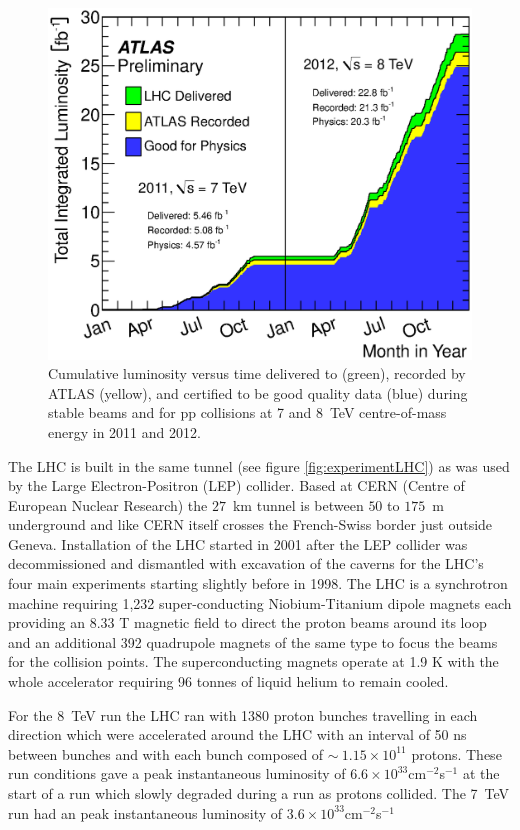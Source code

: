 	\begin{figure}[h!]
        \begin{center}
			\includegraphics[width=0.9\linewidth]{images/intlumivstime2011-2012DQ.eps}
        \end{center}
        \caption{Cumulative luminosity versus time delivered to (green), recorded by ATLAS (yellow), and certified to be good quality data (blue) during stable beams and for pp collisions at 7 and 8~TeV centre-of-mass energy in 2011 and 2012. \cite{LuPublicResults}}
        \label{fig:lum}
    \end{figure}

	
	The LHC is built in the same tunnel (see figure \ref{fig:experimentLHC}) as was used by the Large Electron-Positron (LEP) collider. Based at CERN (Centre of European Nuclear Research) the $27$~km tunnel is between $50$ to $175$~m underground and like CERN itself crosses the French-Swiss border just outside Geneva. Installation of the LHC started in 2001 after the LEP collider was decommissioned and dismantled with excavation of the caverns for the LHC's four main experiments starting slightly before in 1998. The LHC is a synchrotron machine requiring 1,232 super-conducting Niobium-Titanium dipole magnets each providing an 8.33 T magnetic field to direct the proton beams around its loop and an additional 392 quadrupole magnets of the same type to focus the beams for the collision points. The superconducting magnets operate at 1.9 K with the whole accelerator requiring 96 tonnes of liquid helium to remain cooled.


	For the 8~TeV run the LHC ran with 1380 proton bunches travelling in each direction which were accelerated around the LHC with an interval of 50 ns between bunches and with each bunch composed of $\sim~1.15\times10^{11}$ protons. These run conditions gave a peak instantaneous luminosity of $6.6\times10^{33}$cm$^{-2}$s$^{-1}$ at the start of a run which slowly degraded during a run as protons collided. The 7~TeV run had an peak instantaneous luminosity of $3.6\times10^{33}$cm$^{-2}$s$^{-1}$


